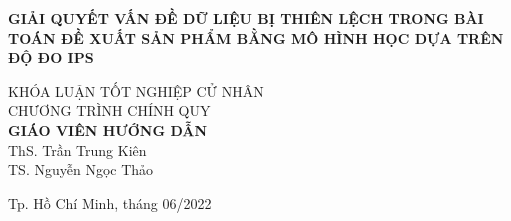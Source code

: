 \begin{titlepage}
\begin{center}

{ \Large \bfseries GIẢI QUYẾT VẤN ĐỀ DỮ LIỆU BỊ THIÊN LỆCH TRONG BÀI TOÁN ĐỀ XUẤT SẢN PHẨM BẰNG MÔ HÌNH HỌC DỰA TRÊN ĐỘ ĐO IPS \\[2cm]}  


\large KHÓA LUẬN TỐT NGHIỆP CỬ NHÂN\\
\large CHƯƠNG TRÌNH CHÍNH QUY\\[2cm]

\textbf{GIÁO VIÊN HƯỚNG DẪN}\\
ThS. Trần Trung Kiên\\
TS. Nguyễn Ngọc Thảo\\



\vfill
Tp. Hồ Chí Minh, tháng 06/2022

\end{center}
\end{titlepage}